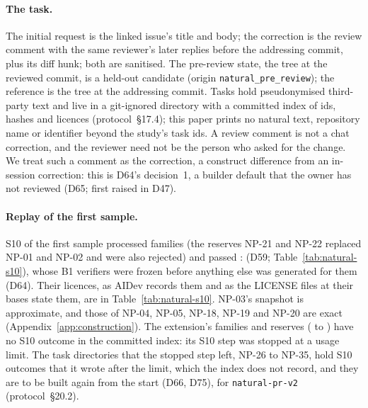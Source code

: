 \paragraph{The task.} The initial request is the linked issue's title and body; the correction is the review comment
with the same reviewer's later replies before the addressing commit, plus its diff hunk; both are sanitised. The
pre-review state, the tree at the reviewed commit, is a held-out candidate (origin \texttt{natural\_pre\_review}); the
reference is the tree at the addressing commit. Tasks hold pseudonymised third-party text and live in a git-ignored
directory with a committed index of ids, hashes and licences (protocol~\S17.4); this paper prints no natural text,
repository name or identifier beyond the study's task ids. A review comment is not a chat correction, and the reviewer
need not be the person who asked for the change. We treat such a comment as the correction, a construct difference from
an in-session correction: this is D64's decision~1, a builder default that the owner has not reviewed (D65; first raised
in D47).

\paragraph{Replay of the first sample.} S10 of the first sample processed  families (the
reserves NP-21 and NP-22 replaced NP-01 and NP-02 and were also rejected) and passed :
 (D59; Table~\ref{tab:natural-s10}), whose B1 verifiers were frozen before anything else was generated for
them (D64). Their licences, as AIDev records them and as the LICENSE files at their bases state them, are in
Table~\ref{tab:natural-s10}. NP-03's snapshot is approximate, and those of NP-04, NP-05,
NP-18, NP-19 and NP-20 are exact (Appendix~\ref{app:construction}). The extension's  families and
 reserves ( to ) have no S10 outcome in the committed index:
its S10 step was stopped at a usage limit. The task directories that the stopped step left, NP-26 to NP-35, hold S10
outcomes that it wrote after the limit, which the index does not record, and they are to be built again from the start
(D66, D75), for \texttt{natural-pr-v2} (protocol~\S20.2).

